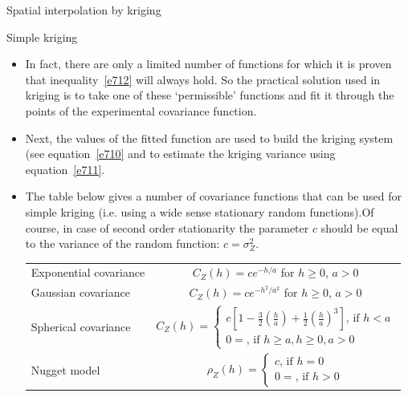 \documentclass[8pt]{beamer}
\renewcommand{\emph}[1]{\textcolor{myorange}{#1}}
\begin{document}
 \begin{frame}{Spatial interpolation by kriging}
    \begin{block}{Simple kriging}
    \end{block}
            \begin{itemize}
                \item In fact, there are only a limited number of functions for which it is proven that inequality~\ref{e712} will always hold. So the practical solution used in \emph{kriging} is to take one of these ‘permissible’ functions and fit it through the points of the experimental \emph{covariance function}. 
                \item Next, the values of the fitted function are used to build the \emph{kriging system} (see equation~\ref{e710} and to estimate the kriging variance using equation~\ref{e711}.
                \item The table below gives a number of \emph{covariance functions} that can be used for simple \emph{kriging} (i.e. using a wide sense stationary random functions).Of course, in case of second order stationarity the parameter $c$ should be equal to the \emph{variance} of the random function: $c = \sigma_Z^2$.
    \begin{center}
  \begin{tabular}{|l|c|}
    Exponential covariance & $C_Z (h) = c e^{-h/a}$ for $h\geq 0$, $a>0$ \\ 
    Gaussian covariance         & $C_Z (h) =  c  e^{-h^2 / a^2}$  for $h\geq 0$, $a>0$ \\ 
    Spherical covariance         & $ C_Z (h) = \left\{ \begin{array}{l}  c \left[ 1 - \frac{3}{2}\left(\frac{h}{a}\right) + \frac{1}{2}\left(\frac{h}{a}\right)^3 \right]   \text{, if } h< a  \\ 0 = \text{, if } h\geq a, h\geq 0, a>0 \end{array} \right. $ \\ 
    Nugget model &  $ \rho_Z (h) = \left\{ \begin{array}{l}  c \text{, if } h=0  \\ 0 = \text{, if } h>0 \end{array} \right. $ \\ 
  \end{tabular}
    \end{center}
            \end{itemize}
    \end{frame}
\end{document}
